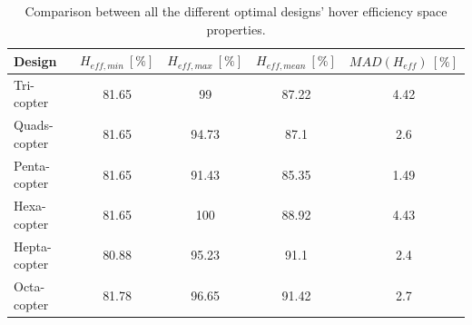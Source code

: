 \begin{table}[!ht]
  \begin{center}
   \caption{Comparison between all the different optimal designs' hover efficiency space properties.}\vspace{1ex}
   \label{tab:tab_all_compare_hover}
     {\scriptsize\begin{tabular}{|l|cccc|}
       \hline
        Design & $H_{eff,min}\ [\%]$ & $H_{eff,max}\ [\%]$ & $H_{eff,mean}\ [\%]$
        & $MAD(H_{eff})\ [\%]$\\ \hline
        Tri-copter & 81.65 & 99 & 87.22 & 4.42\\
        Quads-copter & 81.65 & 94.73 & 87.1 & 2.6\\
        Penta-copter & 81.65 & 91.43 & 85.35 & 1.49\\
        Hexa-copter & 81.65 & 100 & 88.92 & 4.43\\
        Hepta-copter & 80.88 & 95.23 & 91.1 & 2.4 \\
        Octa-copter & 81.78 & 96.65 & 91.42 & 2.7\\
       \hline
    \end{tabular}}
  \end{center}
\end{table}
